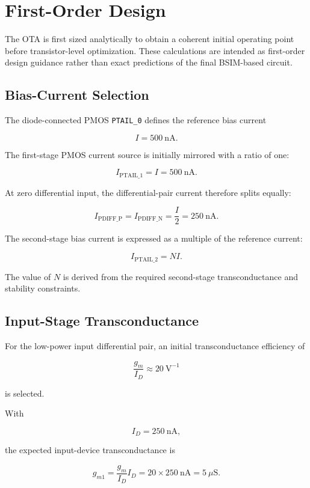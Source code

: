 
\section{First-Order Design}

The OTA is first sized analytically to obtain a coherent initial operating
point before transistor-level optimization. These calculations are intended
as first-order design guidance rather than exact predictions of the final
BSIM-based circuit.

\subsection{Bias-Current Selection}

The diode-connected PMOS \texttt{PTAIL\_0} defines the reference bias
current

\[
I = 500~\mathrm{nA}.
\]

The first-stage PMOS current source is initially mirrored with a ratio of
one:

\[
I_{\mathrm{PTAIL\_1}} = I = 500~\mathrm{nA}.
\]

At zero differential input, the differential-pair current therefore splits
equally:

\[
I_{\mathrm{PDIFF\_P}}
=
I_{\mathrm{PDIFF\_N}}
=
\frac{I}{2}
=
250~\mathrm{nA}.
\]

The second-stage bias current is expressed as a multiple of the reference
current:

\[
I_{\mathrm{PTAIL\_2}} = N I.
\]

The value of $N$ is derived from the required second-stage transconductance
and stability constraints.


\subsection{Input-Stage Transconductance}

For the low-power input differential pair, an initial transconductance
efficiency of

\[
\frac{g_m}{I_D}
\approx
20~\mathrm{V}^{-1}
\]

is selected.

With

\[
I_D = 250~\mathrm{nA},
\]

the expected input-device transconductance is

\[
g_{m1}
=
\frac{g_m}{I_D}I_D
=
20 \times 250~\mathrm{nA}
=
5~\mu\mathrm{S}.
\]


